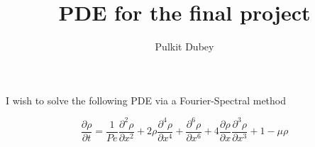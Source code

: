 \documentclass{article}[12]
\title{PDE for the final project}
\author{Pulkit Dubey}
\newcommand{\pd}[2]{\frac{\partial{#1}}{\partial{#2}}}
\newcommand{\pdd}[2]{\frac{\partial^2{#1}}{\partial{#2}^2}}
\begin{document}
\maketitle

I wish to solve the following PDE via a Fourier-Spectral method

\[
    \pd \rho t = \frac{1}{Pe} \pdd \rho x + 
    2 \rho \frac{\partial^4 \rho}{\partial x^4} +
    \frac{\partial^6 \rho}{\partial x^6} +
    4 \frac{\partial \rho}{\partial x} \frac{\partial^3 \rho}{\partial x^3} +
    1 - \mu \rho 
\]
\end{document}
